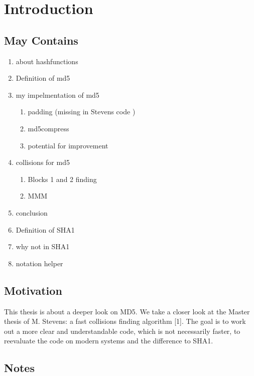 \chapter{Introduction}
\section{May Contains}
\begin{enumerate}

    \item about hashfunctions
    \item Definition of md5
    \item my impelmentation of md5
        \begin{enumerate}
            \item padding (missing in Stevens code )
            \item md5compress
            \item potential for improvement 
        \end{enumerate}
    \item collisions for md5
        \begin{enumerate}
            \item Blocks 1 and 2 finding 

            \item MMM
        \end{enumerate}
    \item conclusion
    \item Definition of SHA1
    \item why not in SHA1
    \item notation helper

\end{enumerate}
\section*{Motivation}
This thesis is about a deeper look on MD5.
We take a closer look at the Master thesis of M. Stevens: a fast collisions finding algorithm [1].
The goal is to work out a more clear and understandable code, which is not necessarily faster, to reevaluate the code on modern systems and the difference to SHA1. 


\section*{Notes}




